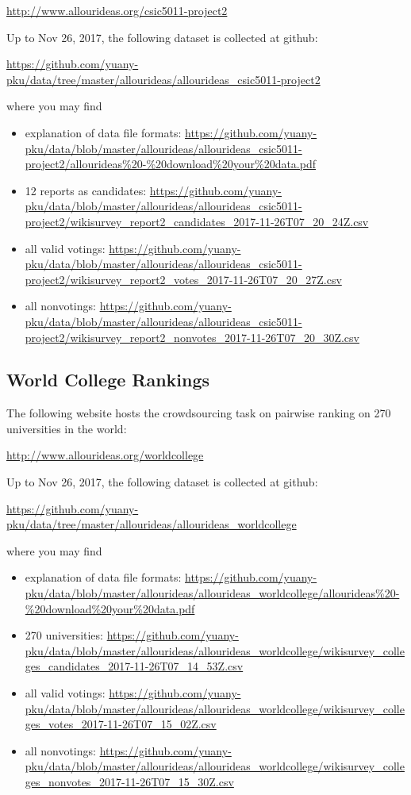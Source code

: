 \documentclass[11pt]{article}
\begin{document}
\url{http://www.allourideas.org/csic5011-project2}

Up to Nov 26, 2017, the following dataset is collected at github:

\url{https://github.com/yuany-pku/data/tree/master/allourideas/allourideas_csic5011-project2}

\noindent where you may find 

\begin{itemize}
\item explanation of data file formats: \url{https://github.com/yuany-pku/data/blob/master/allourideas/allourideas_csic5011-project2/allourideas%20-%20download%20your%20data.pdf}
\item 12 reports as candidates: \url{https://github.com/yuany-pku/data/blob/master/allourideas/allourideas_csic5011-project2/wikisurvey_report2_candidates_2017-11-26T07_20_24Z.csv}
\item all valid votings: \url{https://github.com/yuany-pku/data/blob/master/allourideas/allourideas_csic5011-project2/wikisurvey_report2_votes_2017-11-26T07_20_27Z.csv}
\item all nonvotings: \url{https://github.com/yuany-pku/data/blob/master/allourideas/allourideas_csic5011-project2/wikisurvey_report2_nonvotes_2017-11-26T07_20_30Z.csv} 
\end{itemize}

\subsection{World College Rankings}
The following website hosts the crowdsourcing task on pairwise ranking on 270 universities in the world:

\url{http://www.allourideas.org/worldcollege}

Up to Nov 26, 2017, the following dataset is collected at github:

\url{https://github.com/yuany-pku/data/tree/master/allourideas/allourideas_worldcollege}

\noindent where you may find 

\begin{itemize}
\item explanation of data file formats: \url{https://github.com/yuany-pku/data/blob/master/allourideas/allourideas_worldcollege/allourideas%20-%20download%20your%20data.pdf}
\item 270 universities: \url{https://github.com/yuany-pku/data/blob/master/allourideas/allourideas_worldcollege/wikisurvey_colleges_candidates_2017-11-26T07_14_53Z.csv}
\item all valid votings: \url{https://github.com/yuany-pku/data/blob/master/allourideas/allourideas_worldcollege/wikisurvey_colleges_votes_2017-11-26T07_15_02Z.csv}
\item all nonvotings: \url{https://github.com/yuany-pku/data/blob/master/allourideas/allourideas_worldcollege/wikisurvey_colleges_nonvotes_2017-11-26T07_15_30Z.csv} 
\end{itemize}
\end{document}

